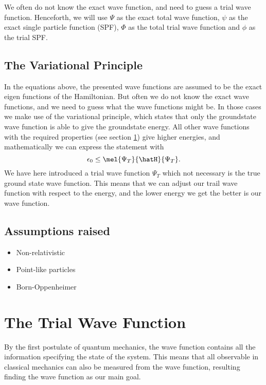We often do not know the exact wave function, and need to guess a trial wave function. Henceforth, we will use $\Psi$ as the exact total wave function, $\psi$ as the exact single particle function (SPF), $\Phi$ as the total trial wave function and $\phi$ as the trial SPF. 
\cite{GriffQuan}

\subsection{The Variational Principle}
In the equations above, the presented wave functions are assumed to be the exact eigen functions of the Hamiltonian. But often we do not know the exact wave functions, and we need to guess what the wave functions might be. In those cases we make use of the variational principle, which states that only the groundstate wave function is able to give the groundstate energy. All other wave functions with the required properties (see section \ref{subsec:wavefunction}) give higher energies, and mathematically we can express the statement with
\begin{equation}
\epsilon_0\leq\mel{\Psi_T}{\hatH}{\Psi_T}.
\label{eq:variationalprinciple}
\end{equation}
We have here introduced a trial wave function $\Psi_T$ which not necessary is the true ground state wave function. This means that we can adjust our trail wave function with respect to the energy, and the lower energy we get the better is our wave function. 

\subsection{Assumptions raised}
\begin{itemize}
	\item Non-relativistic
	\item Point-like particles
	\item Born-Oppenheimer
\end{itemize}

\section{The Trial Wave Function} \label{subsec:wavefunction}
By the first postulate of quantum mechanics, the wave function contains all the information specifying the state of the system. This means that all observable in classical mechanics can also be measured from the wave function, resulting finding the wave function as our main goal. 

